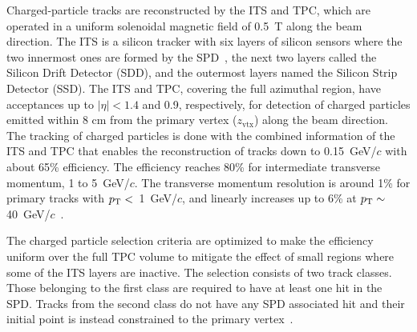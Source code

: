 Charged-particle tracks are reconstructed by the ITS and TPC, which are operated in a uniform solenoidal magnetic field of 0.5~T along the beam direction. The ITS is a silicon tracker with six layers of silicon sensors where the two innermost ones are formed by the SPD~\cite{Santoro2009:ALICESPD}, the next two layers called the Silicon Drift Detector (SDD), and the outermost layers named the Silicon Strip Detector (SSD). The ITS and TPC, covering the full azimuthal region, have acceptances up to $|\eta| < 1.4$ and 0.9, respectively, for detection of charged particles emitted within 8 cm from the primary vertex ($z_\mathrm{vtx}$) along the beam direction. The tracking of charged particles is done with the combined information of the ITS and TPC that enables the reconstruction of tracks down to 0.15~GeV/$c$ with about 65\% efficiency. The efficiency reaches 80\% for intermediate transverse momentum, 1 to 5~GeV/$c$. The transverse momentum resolution is around 1\% for primary tracks with $p_\mathrm{T}<$~1~GeV/$c$, and linearly increases up to 6\% at $p_\mathrm{T} \sim$ 40~GeV/$c$~\cite{Contin_2012:ITSPTRES}.

The charged particle selection criteria are optimized to make the efficiency uniform over the full TPC volume to mitigate the effect of small regions where some of the ITS layers are inactive. The selection consists of two track classes. Those belonging to the first class are required to have at least one hit in the SPD. Tracks from the second class do not have any SPD associated hit and their initial point is instead constrained to the primary vertex~\cite{Adam:2015ewa}.


